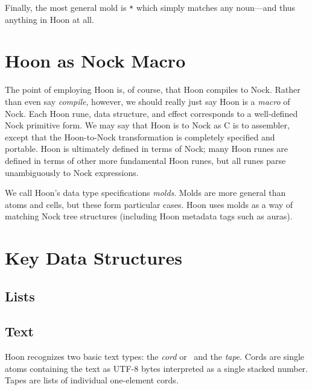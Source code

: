 Finally, the most general mold is \texttt{*} which simply matches any noun—and thus anything in Hoon at all.

\section{Hoon as Nock Macro}

The point of employing Hoon is, of course, that Hoon compiles to Nock.  Rather than even say \emph{compile}, however, we should really just say Hoon is a \emph{macro} of Nock.  Each Hoon rune, data structure, and effect corresponds to a well-defined Nock primitive form.  We may say that Hoon is to Nock as C is to assembler, except that the Hoon-to-Nock transformation is completely specified and portable.  Hoon is ultimately defined in terms of Nock; many Hoon runes are defined in terms of other more fundamental Hoon runes, but all runes parse unambiguously to Nock expressions.


We call Hoon's data type specifications \emph{molds}.  Molds are more general than atoms and cells, but these form particular cases.  Hoon uses molds as a way of matching Nock tree structures (including Hoon metadata tags such as auras).




\section{Key Data Structures}

\subsection{Lists}

\subsection{Text}


Hoon recognizes two basic text types:  the \emph{cord} or \patt~and the \emph{tape}.  Cords are single atoms containing the text as UTF-8 bytes interpreted as a single stacked number.  Tapes are lists of individual one-element cords.

